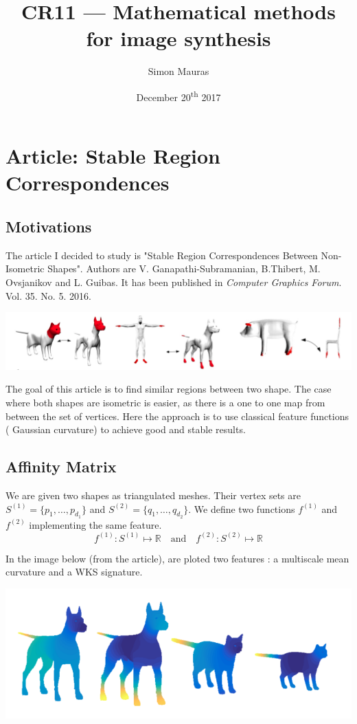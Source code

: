 \documentclass[a4paper]{article}
\title{CR11 --- Mathematical methods for image synthesis}
\author{Simon Mauras}
\date{December 20\textsuperscript{th} 2017}
\begin{document}
  
  \maketitle
  
  \section{Article: Stable Region Correspondences}

  \subsection{Motivations}

  The article I decided to study is "Stable Region Correspondences Between Non-Isometric Shapes". Authors are V. Ganapathi-Subramanian, B.Thibert, M. Ovsjanikov and L. Guibas. It has been published in \textit{Computer Graphics Forum}. Vol. 35. No. 5. 2016.
  
  \bigskip\includegraphics[width=\textwidth]{article/intro.png}
  
  The goal of this article is to find similar regions between two shape. The case where both shapes are isometric is easier, as there is a one to one map from between the set of vertices. Here the approach is to use classical feature functions ( Gaussian curvature) to achieve good and stable results.

  \subsection{Affinity Matrix}

  We are given two shapes as triangulated meshes. Their vertex sets are $S^{(1)} = \{p_1, \dots, p_{d_1}\}$ and $S^{(2)} = \{q_1, \dots, q_{d_2}\}$. We define two functions $f^{(1)}$ and $f^{(2)}$ implementing the same feature.
  \[f^{(1)} : S^{(1)} \mapsto \mathbb R \quad\text{and}\quad f^{(2)} : S^{(2)} \mapsto \mathbb R\]
  
  In the image below (from the article), are ploted two features : a multiscale mean curvature and a WKS signature.
  
  \includegraphics[width=\textwidth]{article/features.png}
  
\end{document}
